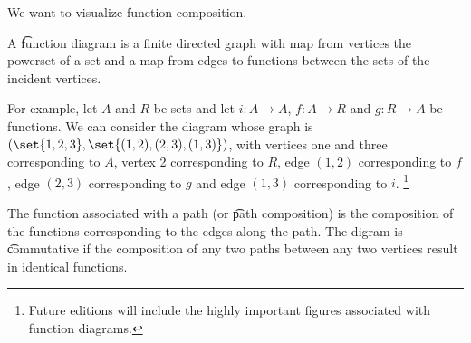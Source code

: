 

We want to visualize function composition.


A \t{function diagram} is a finite directed graph with map from vertices the powerset of a set and a map from edges to functions between the sets of the incident vertices.


For example, let $A$ and $R$ be sets and let $i: A \to A$, $f: A \to R$ and $g: R \to A$ be functions.
We can consider the diagram whose graph is $(\set{1, 2, 3}, \set{(1, 2), (2, 3), (1, 3)})$, with vertices one and three corresponding to $A$, vertex 2 corresponding to $R$, edge $(1, 2)$ corresponding to $f$, edge $(2, 3)$ corresponding to $g$ and edge $(1, 3)$ corresponding to $i$.
\footnote{Future editions will include the highly important figures associated with function diagrams.}


The function associated with a path (or \t{path composition}) is the composition of the functions corresponding to the edges along the path.
The digram is \t{commutative} if the composition of any two paths between any two vertices result in identical functions.

\blankpage
